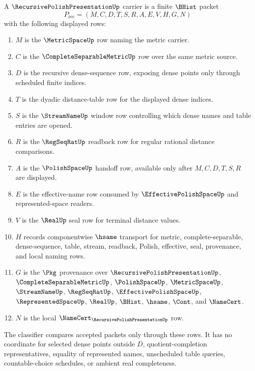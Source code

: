 \begin{definition}
\label{def:recursive-polish-presentation-carrier}
A $\RecursivePolishPresentationUp$ carrier is a finite $\BHist$ packet
$$
P_{\mathrm{rec}}=(M,C,D,T,S,R,A,E,V,H,G,N)
$$
with the following displayed rows:
\begin{enumerate}
  \item $M$ is the $\MetricSpaceUp$ row naming the metric carrier.
  \item $C$ is the $\CompleteSeparableMetricUp$ row over the same metric source.
  \item $D$ is the recursive dense-sequence row, exposing dense points only through scheduled finite indices.
  \item $T$ is the dyadic distance-table row for the displayed dense indices.
  \item $S$ is the $\StreamNameUp$ window row controlling which dense names and table entries are opened.
  \item $R$ is the $\RegSeqRatUp$ readback row for regular rational distance comparisons.
  \item $A$ is the $\PolishSpaceUp$ handoff row, available only after $M,C,D,T,S,R$ are displayed.
  \item $E$ is the effective-name row consumed by $\EffectivePolishSpaceUp$ and represented-space readers.
  \item $V$ is the $\RealUp$ seal row for terminal distance values.
  \item $H$ records componentwise $\hsame$ transport for metric, complete-separable, dense-sequence, table, stream, readback, Polish, effective, seal, provenance, and local naming rows.
  \item $G$ is the $\Pkg$ provenance over $\RecursivePolishPresentationUp$, $\CompleteSeparableMetricUp$, $\PolishSpaceUp$, $\MetricSpaceUp$, $\StreamNameUp$, $\RegSeqRatUp$, $\EffectivePolishSpaceUp$, $\RepresentedSpaceUp$, $\RealUp$, $\BHist$, $\hsame$, $\Cont$, and $\NameCert$.
  \item $N$ is the local $\NameCert_{\RecursivePolishPresentationUp}$ row.
\end{enumerate}
The classifier compares accepted packets only through these rows. It has no coordinate for selected dense points outside $D$, quotient-completion representatives, equality of represented names, unscheduled table queries, countable-choice schedules, or ambient real completeness.
\end{definition}

